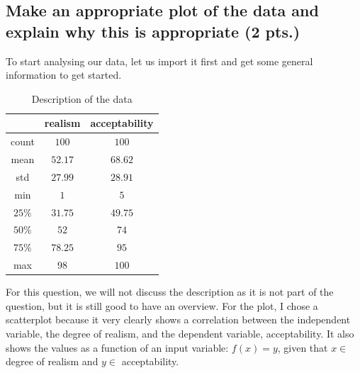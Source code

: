 \documentclass[a4paper]{article}
\begin{document}
\subsection{Make an appropriate plot of the data and explain why this is appropriate (2 pts.)}
To start analysing our data, let us import it first and get some general information to get started.
\begin{table}[H]
    \centering
    \begin{tabular}{|c|c|c|}
    \hline
    & realism & acceptability \\
    \hline
count & 	$100$	 & $100$\\
\hline
mean & 	$52.17$	 & $68.62$\\
\hline
std	 & $27.99$	 & $28.91$\\
\hline
min	& $1$	& $5$\\
\hline
$25\%$	& $31.75$	& $49.75$\\
\hline
$50\%$	& $52$	& $74$\\
\hline
$75\%$	& $78.25$	& $95$\\
\hline
max	& $98$	& $100$\\
\hline
    \end{tabular}
    \caption{Description of the data}
    \label{tab:q3describe}
\end{table}
For this question, we will not discuss the description as it is not part of the question, but it is still good to have an overview. \newline
For the plot, I chose a scatterplot because it very clearly shows a correlation between the independent variable, the degree of realism, and the dependent variable, acceptability. It also shows the values as a function of an input variable: $f(x)=y$, given that $x\in$ degree of realism and $y\in$ acceptability.
\end{document}

